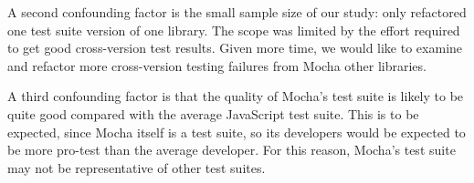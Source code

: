 A second confounding factor is the small sample size of our study:
only refactored one test suite version of one library. The scope was
limited by the effort required to get good cross-version test
results. Given more time, we would like to examine and refactor more
cross-version testing failures from Mocha other libraries.

A third confounding factor is that the quality of Mocha's test suite
is likely to be quite good compared with the average JavaScript test
suite. This is to be expected, since Mocha itself is a test suite, so
its developers would be expected to be more pro-test than the average
developer. For this reason, Mocha's test suite may not be
representative of other test suites.

